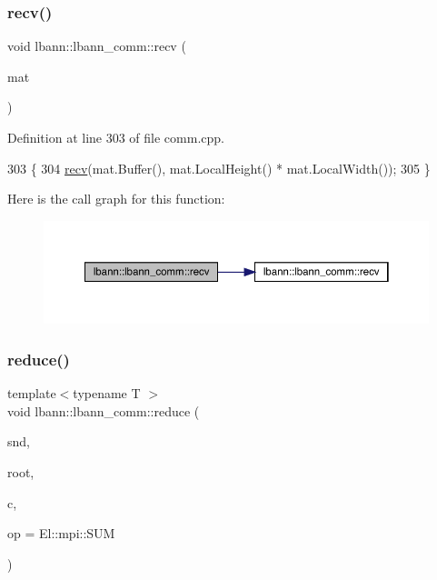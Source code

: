 \subsubsection{\texorpdfstring{recv()}{recv()}\hspace{0.1cm}{\footnotesize\ttfamily [9/9]}}
{\footnotesize\ttfamily void lbann\+::lbann\+\_\+comm\+::recv (\begin{DoxyParamCaption}\item[{\hyperlink{base_8hpp_a0fab5387556805cfeac3e7e567bf66c5}{Dist\+Mat} \&}]{mat }\end{DoxyParamCaption})}



Definition at line 303 of file comm.\+cpp.


\begin{DoxyCode}
303                                   \{
304   \hyperlink{classlbann_1_1lbann__comm_af8842cd4cea390f76d9146e1c4578de4}{recv}(mat.Buffer(), mat.LocalHeight() * mat.LocalWidth());
305 \}
\end{DoxyCode}
Here is the call graph for this function\+:\nopagebreak
\begin{figure}[H]
\begin{center}
\leavevmode
\includegraphics[width=350pt]{classlbann_1_1lbann__comm_acc92b86b30287689870e018b062076f8_cgraph}
\end{center}
\end{figure}
\mbox{\label{classlbann_1_1lbann__comm_ab8a2261394c978aa7e4b74ecebc739a8}} 
\subsubsection{\texorpdfstring{reduce()}{reduce()}\hspace{0.1cm}{\footnotesize\ttfamily [1/4]}}
{\footnotesize\ttfamily template$<$typename T $>$ \\
void lbann\+::lbann\+\_\+comm\+::reduce (\begin{DoxyParamCaption}\item[{T}]{snd,  }\item[{int}]{root,  }\item[{const El\+::mpi\+::\+Comm}]{c,  }\item[{El\+::mpi\+::\+Op}]{op = {\ttfamily El\+:\+:mpi\+:\+:SUM} }\end{DoxyParamCaption})\hspace{0.3cm}{\ttfamily [inline]}}

